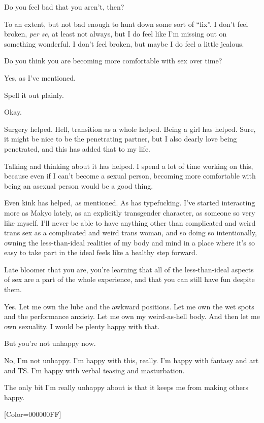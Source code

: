 \begin{paracol}{2}
\begin{leftcolumn}
\begin{ally}
Do you feel bad that you aren't, then?
\end{ally}
To an extent, but not bad enough to hunt down some sort of ``fix''. I don't feel broken, \emph{per se}, at least not always, but I do feel like I'm missing out on something wonderful. I don't feel broken, but maybe I do feel a little jealous.
\newpage

\begin{ally}
Do you think you are becoming more comfortable with sex over time?
\end{ally}
Yes, as I've mentioned.

\begin{ally}
Spell it out plainly.
\end{ally}
Okay.

Surgery helped. Hell, transition as a whole helped. Being a girl has helped. Sure, it might be nice to be the penetrating partner, but I also dearly love being penetrated, and this has added that to my life.

Talking and thinking about it has helped. I spend a lot of time working on this, because even if I can't become a sexual person, becoming more comfortable with being an asexual person would be a good thing.

Even kink has helped, as mentioned. As has typefucking. I've started interacting more as Makyo lately, as an explicitly transgender character, as someone so very like myself. I'll never be able to have anything other than complicated and weird trans sex as a complicated and weird trans woman, and so doing so intentionally, owning the less-than-ideal realities of my body and mind in a place where it's so easy to take part in the ideal feels like a healthy step forward.

\begin{ally}
Late bloomer that you are, you're learning that all of the less-than-ideal aspects of sex are a part of the whole experience, and that you can still have fun despite them.
\end{ally}
Yes. Let me own the lube and the awkward positions. Let me own the wet spots and the performance anxiety. Let me own my weird-as-hell body. And then let me own sexuality. I would be plenty happy with that.

\begin{ally}
But you're not unhappy now.
\end{ally}
No, I'm not unhappy. I'm happy with this, really. I'm happy with fantasy and art and TS. I'm happy with verbal teasing and masturbation.

The only bit I'm really unhappy about is that it keeps me from making others happy.
\newpage
\end{leftcolumn}
\end{paracol}
\resetbackgroundcolor

\renewfontfamily{}[Color=000000FF]
